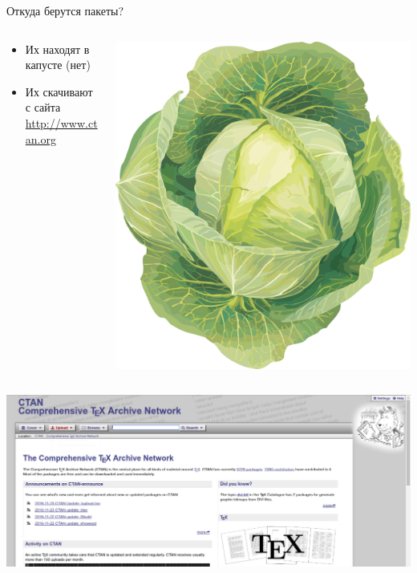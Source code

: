 \documentclass[newPxFont]{beamer}
\begin{document}
\begin{frame}{Откуда берутся пакеты?}

\begin{columns}
\begin{column}{.66\linewidth}
\begin{itemize}
\item Их находят в капусте (нет)
\item Их скачивают с сайта \url{http://www.ctan.org}
\end{itemize}
\end{column}
\begin{column}{.33\linewidth}
\hfill \includegraphics[width=\linewidth]{cabage.png}	
\end{column}
\end{columns}
\includegraphics[width=0.7\linewidth]{CTAN.png}	
\end{frame}
\end{document}

